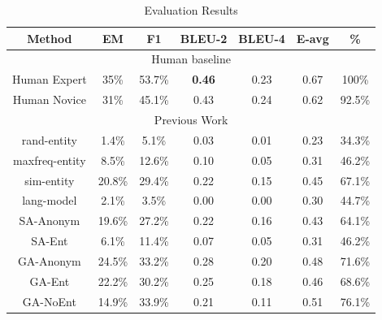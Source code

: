 \documentclass[onecolumn, conference]{IEEEtran}
\begin{document}
\begin{table}
  \centering
  \caption{Evaluation Results}
  \begin{tabular}{|c|c|c|c|c|c|c|} \hline
    \textbf{Method} & \textbf{EM}     & \textbf{F1}     & \textbf{BLEU-2} & \textbf{BLEU-4} & \textbf{E-avg} & \textbf{\%}      \\ \hline
    \multicolumn{7}{|c|}{Human baseline \cite{Suster2018}}                                                                      \\ \hline
    Human Expert    & 35\%            & 53.7\%          & \textbf{0.46}   & 0.23            & 0.67           & 100\%            \\ \hline
    Human Novice    & 31\%            & 45.1\%          & 0.43            & 0.24            & 0.62           & 92.5\%           \\ \hline
    \multicolumn{7}{|c|}{Previous Work \cite{Suster2018}}                                                                       \\ \hline
    rand-entity     & 1.4\%           & 5.1\%           & 0.03            & 0.01            & 0.23           & 34.3\%           \\ \hline
    maxfreq-entity  & 8.5\%           & 12.6\%          & 0.10            & 0.05            & 0.31           & 46.2\%           \\ \hline
    sim-entity      & 20.8\%          & 29.4\%          & 0.22            & 0.15            & 0.45           & 67.1\%           \\ \hline
    lang-model      & 2.1\%           & 3.5\%           & 0.00            & 0.00            & 0.30           & 44.7\%           \\ \hline
    SA-Anonym       & 19.6\%          & 27.2\%          & 0.22            & 0.16            & 0.43           & 64.1\%           \\ \hline
    SA-Ent          & 6.1\%           & 11.4\%          & 0.07            & 0.05            & 0.31           & 46.2\%           \\ \hline
    GA-Anonym       & 24.5\%          & 33.2\%          & 0.28            & 0.20            & 0.48           & 71.6\%           \\ \hline
    GA-Ent          & 22.2\%          & 30.2\%          & 0.25            & 0.18            & 0.46           & 68.6\%           \\ \hline
    GA-NoEnt        & 14.9\%          & 33.9\%          & 0.21            & 0.11            & 0.51           & 76.1\%           \\ \hline

\end{tabular}
\end{table}
\end{document}
